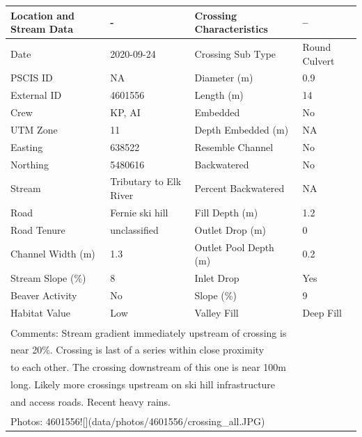 \documentclass[
]{book}
\begin{document}
\begin{tabular}{l|l|l|l}
\hline
Location and Stream Data & - & Crossing Characteristics & --\\
\hline
Date & 2020-09-24 & Crossing Sub Type & Round Culvert\\
\hline
PSCIS ID & NA & Diameter (m) & 0.9\\
\hline
External ID & 4601556 & Length (m) & 14\\
\hline
Crew & KP, AI & Embedded & No\\
\hline
UTM Zone & 11 & Depth Embedded (m) & NA\\
\hline
Easting & 638522 & Resemble Channel & No\\
\hline
Northing & 5480616 & Backwatered & No\\
\hline
Stream & Tributary to Elk River & Percent Backwatered & NA\\
\hline
Road & Fernie ski hill & Fill Depth (m) & 1.2\\
\hline
Road Tenure & unclassified & Outlet Drop (m) & 0\\
\hline
Channel Width (m) & 1.3 & Outlet Pool Depth (m) & 0.2\\
\hline
Stream Slope (\%) & 8 & Inlet Drop & Yes\\
\hline
Beaver Activity & No & Slope (\%) & 9\\
\hline
Habitat Value & Low & Valley Fill & Deep Fill\\
\hline
\multicolumn{4}{l}{\textsuperscript{} Comments: Stream gradient immediately upstream of crossing is}\\
\multicolumn{4}{l}{near 20\%. Crossing is last of a series within close proximity}\\
\multicolumn{4}{l}{to each other. The crossing downstream of this one is near 100m}\\
\multicolumn{4}{l}{long. Likely more crossings upstream on ski hill infrastructure}\\
\multicolumn{4}{l}{and access roads. Recent heavy rains.}\\
\multicolumn{4}{l}{\textsuperscript{} Photos: 4601556![](data/photos/4601556/crossing\_all.JPG)}\\
\end{tabular}
\end{document}
